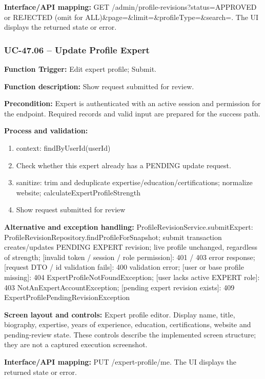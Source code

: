 \textbf{Interface/\allowbreak{}API mapping:} GET /\allowbreak{}admin/\allowbreak{}profile-revisions?status=\allowbreak{}APPROVED or REJECTED (omit for ALL)\&\allowbreak{}page=\allowbreak{}\&\allowbreak{}limit=\allowbreak{}\&\allowbreak{}profile\allowbreak{}Type=\allowbreak{}\&\allowbreak{}search=\allowbreak{}. The UI displays the returned state or error.

\subsubsection{UC-47.06 -- Update Profile Expert}
\textbf{Function Trigger:} Edit expert profile; Submit.

\textbf{Function description:} Show request submitted for review.

\textbf{Precondition:} Expert is authenticated with an active session and permission for the endpoint. Required records and valid input are prepared for the success path.

\textbf{Process and validation:}
\begin{enumerate}
\item context: find\allowbreak{}By\allowbreak{}User\allowbreak{}Id(user\allowbreak{}Id)
\item Check whether this expert already has a PENDING update request.
\item sanitize: trim and deduplicate expertise/\allowbreak{}education/\allowbreak{}certifications; normalize website; calculate\allowbreak{}Expert\allowbreak{}Profile\allowbreak{}Strength
\item Show request submitted for review
\end{enumerate}
\textbf{Alternative and exception handling:} Profile\allowbreak{}Revision\allowbreak{}Service.submit\allowbreak{}Expert: Profile\allowbreak{}Revision\allowbreak{}Repository.find\allowbreak{}Profile\allowbreak{}For\allowbreak{}Snapshot; submit transaction creates/\allowbreak{}updates PENDING EXPERT revision; live profile unchanged, regardless of strength; [invalid token /\allowbreak{} session /\allowbreak{} role permission]: 401 /\allowbreak{} 403 error response; [request DTO /\allowbreak{} id validation fails]: 400 validation error; [user or base profile missing]: 404 Expert\allowbreak{}Profile\allowbreak{}Not\allowbreak{}Found\allowbreak{}Exception; [user lacks active EXPERT role]: 403 Not\allowbreak{}An\allowbreak{}Expert\allowbreak{}Account\allowbreak{}Exception; [pending expert revision exists]: 409 Expert\allowbreak{}Profile\allowbreak{}Pending\allowbreak{}Revision\allowbreak{}Exception

\textbf{Screen layout and controls:} Expert profile editor. Display name, title, biography, expertise, years of experience, education, certifications, website and pending-review state. These controls describe the implemented screen structure; they are not a captured execution screenshot.

\textbf{Interface/\allowbreak{}API mapping:} PUT /\allowbreak{}expert-profile/\allowbreak{}me. The UI displays the returned state or error.

\endgroup

